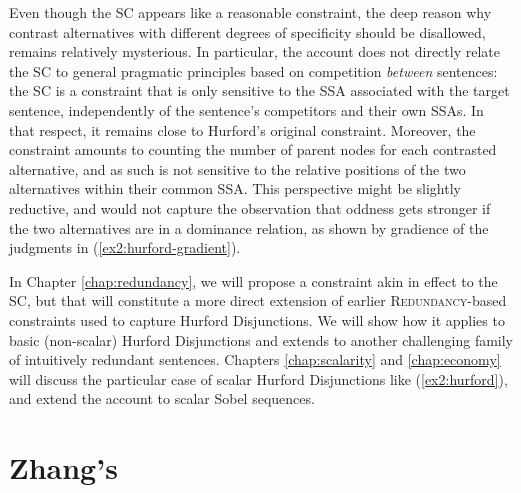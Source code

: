Even though the SC appears like a reasonable constraint, the deep reason why contrast alternatives with different degrees of specificity should be disallowed, remains relatively mysterious. In particular, the account does not directly relate the SC to general pragmatic principles based on competition \textit{between} sentences: the SC is a constraint that is only sensitive to the SSA associated with the target sentence, independently of the sentence's competitors and their own SSAs. In that respect, it remains close to Hurford's original constraint. Moreover, the constraint amounts to counting the number of parent nodes for each contrasted alternative, and as such is not sensitive to the relative positions of the two alternatives within their common SSA. This perspective might be slightly reductive, and would not capture the observation that oddness gets stronger if the two alternatives are in a dominance relation, as shown by gradience of the judgments in (\ref{ex2:hurford-gradient}).

\begin{exe}
	\ex\label{ex2:hurford-gradient}
	\begin{xlist}
	\end{xlist}
\end{exe}


In Chapter \ref{chap:redundancy}, we will propose a constraint akin in effect to the SC, but that will constitute a more direct extension of earlier \textsc{Redundancy}-based constraints used to capture Hurford Disjunctions. We will show how it applies to basic (non-scalar) Hurford Disjunctions and extends to another challenging family of intuitively redundant sentences. Chapters \ref{chap:scalarity} and \ref{chap:economy} will discuss the particular case of scalar Hurford Disjunctions like (\ref{ex2:hurford}), and extend the account to scalar Sobel sequences.


\section{Zhang's }



